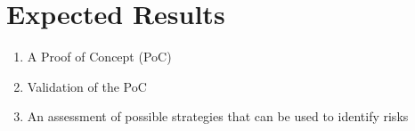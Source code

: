\section{Expected Results} \label{sec:expected-results}

\begin{enumerate}
    \item A Proof of Concept (PoC)
    \item Validation of the PoC
    \item An assessment of possible strategies that can be used to identify risks
\end{enumerate}